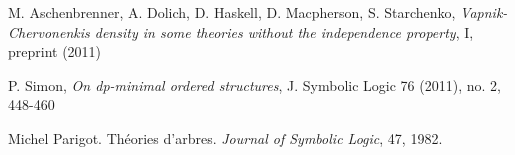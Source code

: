 \documentclass{amsart}
\begin{document}
\begin{thebibliography}{9}

	M. Aschenbrenner, A. Dolich, D. Haskell, D. Macpherson, S. Starchenko,
	\textit{Vapnik-Chervonenkis density in some theories without the independence property}, I, preprint (2011)

	P. Simon,
	\textit{On dp-minimal ordered structures},
	J. Symbolic Logic 76 (2011), no. 2, 448-460

	Michel Parigot.
	Th\'eories d'arbres.
	\textit{Journal of Symbolic Logic}, 47, 1982.
	
	
\end{thebibliography}
\end{document}
